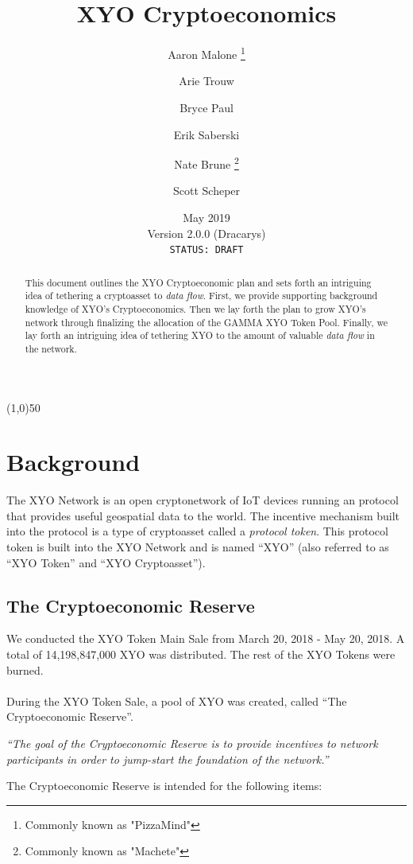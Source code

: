 \documentclass{article}
\title {XYO Cryptoeconomics}
\author{
    Aaron Malone \thanks{Commonly known as "PizzaMind"}\\
    \and
    Arie Trouw\\
    \and    
    Bryce Paul\\
    \and
    Erik Saberski\\
    \and
    Nate Brune \thanks{Commonly known as "Machete"}\\
    \and
    Scott Scheper\\
}
\date{May 2019 \\ Version 2.0.0 (Dracarys)\\ \texttt{STATUS: DRAFT}}
\begin{document}
\pagecolor{limegreen}

\maketitle

\begin{center}
\line(1,0){50}
\end{center}

\begin{abstract}
This document outlines the XYO Cryptoeconomic plan and sets forth an intriguing idea of tethering a cryptoasset to \textit{data flow}. First, we provide supporting background knowledge of XYO's Cryptoeconomics. Then we lay forth the plan to grow XYO's network through finalizing the allocation of the GAMMA XYO Token Pool. Finally, we lay forth an intriguing idea of tethering XYO to the amount of valuable \textit{data flow} in the network.
\end{abstract}

\section{Background}
The XYO Network is an open cryptonetwork of IoT devices running an protocol that provides useful geospatial data to the world. The incentive mechanism built into the protocol is a type of cryptoasset called a \textit{protocol token}. This protocol token is built into the XYO Network and is named ``XYO'' (also referred to as ``XYO Token'' and ``XYO Cryptoasset'').

\subsection{The Cryptoeconomic Reserve}
We conducted the XYO Token Main Sale from March 20, 2018 - May 20, 2018. A total of 14,198,847,000 XYO was distributed. The rest of the XYO Tokens were burned.\\
\\During the XYO Token Sale, a pool of XYO was created, called “The Cryptoeconomic Reserve”.

\begin{displayquote}\textit{``The goal of the Cryptoeconomic Reserve is to provide incentives to network participants in order to jump-start the foundation of the network.''} \cite{crypto-reserve}
\end{displayquote}

The Cryptoeconomic Reserve is intended for the following items:
\end{document}

